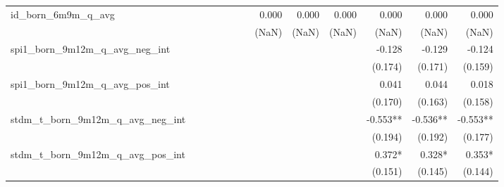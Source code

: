 \begin{tabular}{lrrrrrrrrrrrr}
id\_born\_6m9m\_q\_avg                      &              &              &              &              &              &              &        0.000 &        0.000 &        0.000 &        0.000 &        0.000 &        0.000 \\ 
                                            &              &              &              &              &              &              &        (NaN) &        (NaN) &        (NaN) &        (NaN) &        (NaN) &        (NaN) \\ 
spi1\_born\_9m12m\_q\_avg\_neg\_int         &              &              &              &              &              &              &              &              &              &       -0.128 &       -0.129 &       -0.124 \\ 
                                            &              &              &              &              &              &              &              &              &              &      (0.174) &      (0.171) &      (0.159) \\ 
spi1\_born\_9m12m\_q\_avg\_pos\_int         &              &              &              &              &              &              &              &              &              &        0.041 &        0.044 &        0.018 \\ 
                                            &              &              &              &              &              &              &              &              &              &      (0.170) &      (0.163) &      (0.158) \\ 
stdm\_t\_born\_9m12m\_q\_avg\_neg\_int      &              &              &              &              &              &              &              &              &              &     -0.553** &     -0.536** &     -0.553** \\ 
                                            &              &              &              &              &              &              &              &              &              &      (0.194) &      (0.192) &      (0.177) \\ 
stdm\_t\_born\_9m12m\_q\_avg\_pos\_int      &              &              &              &              &              &              &              &              &              &       0.372* &       0.328* &       0.353* \\ 
                                            &              &              &              &              &              &              &              &              &              &      (0.151) &      (0.145) &      (0.144) \\ 

\end{tabular}
